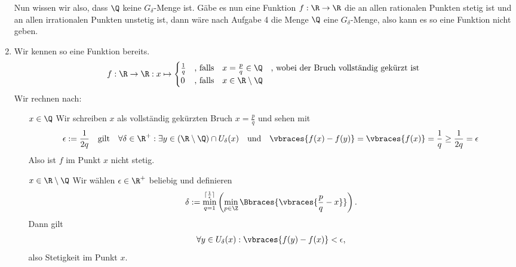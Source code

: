\begin{solution}
\begin{enumerate}[label = (\roman*)]
  Nun wissen wir also, dass $\Q$ keine $G_\delta$-Menge ist. Gäbe es nun eine Funktion $f: \R \to \R$ die an allen rationalen Punkten stetig ist und an allen irrationalen Punkten unstetig ist, dann wäre nach Aufgabe 4 die Menge $\Q$ eine $G_\delta$-Menge, also kann es so eine Funktion nicht geben.
  \item Wir kennen so eine Funktion bereits.
  \begin{align*}
    f: \R \to \R: x \mapsto
    \begin{cases}
      \frac{1}{q} &\textrm{, falls} \quad x = \frac{p}{q} \in \Q \quad \textrm{, wobei der Bruch vollständig gekürzt ist} \\
      0 &\textrm{, falls} \quad x \in \R \setminus \Q
    \end{cases}
  \end{align*}
  Wir rechnen nach:
  \begin{enumerate}
    \item[\glqq $x \in \Q$ \grqq] Wir schreiben $x$ als vollständig gekürzten Bruch $x = \frac{p}{q}$ und sehen mit
    \begin{align*}
      \epsilon := \frac{1}{2q} \quad \textrm{gilt} \quad \forall\delta \in \R^+: \exists y \in (\R \setminus \Q) \cap U_\delta(x) \quad \textrm{und} \quad \vbraces{f(x) - f(y)} = \vbraces{f(x)} = \frac{1}{q} \geq \frac{1}{2q} = \epsilon
    \end{align*}
    Also ist $f$ im Punkt $x$ nicht stetig.
    \item[\glqq $x \in \R \setminus \Q$ \grqq] Wir wählen $\epsilon \in \R^+$ beliebig und definieren
    \begin{align*}
      \delta := \min_{q = 1}^{\lceil \frac{1}{\epsilon} \rceil}\left( \min_{p \in \Z}\Bbraces{\vbraces{\frac{p}{q} - x}}\right).
    \end{align*}
    Dann gilt
    \begin{align*}
      \forall y \in U_\delta(x): \vbraces{f(y) -f(x)} < \epsilon,
    \end{align*}
    also Stetigkeit im Punkt $x$.
  \end{enumerate}
\end{enumerate}
\end{solution}
